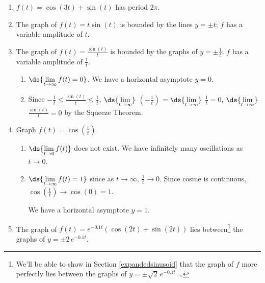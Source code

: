 \documentclass{ximera}
\begin{document}
\begin{enumerate}

\setcounter{enumi}{\value{HW}}

\item  $f(t) = \cos(3t) + \sin(t)$ has period $2\pi$.

\item  The graph of  $f(t) = t \sin(t)$ is bounded by the lines  $y = \pm t$;   $f$ has a variable amplitude of $t$.

\item The graph of $f(t) = \frac{\sin(t)}{t}$ is  bounded by the graphs of  $y = \pm \frac{1}{t}$; $f$ has a variable amplitude of $\frac{1}{t}$.

\begin{enumerate}

\item  $\ds{\lim_{t \rightarrow \infty} f(t) = 0}$.    We have a horizontal asymptote $y = 0$.

\item  Since   $-\frac{1}{t} \leq \frac{\sin(t)}{t} \leq \frac{1}{t}$,  $\ds{\lim_{t \rightarrow \infty}}$  $\left(- \frac{1}{t}\right)$ $=\ds{\lim_{t \rightarrow \infty}}$ $\frac{1}{t} = 0$,    $\ds{\lim_{t \rightarrow \infty}}$ $\frac{\sin(t)}{t} = 0$ by the Squeeze Theorem.

\end{enumerate}


\item  Graph $f(t) = \cos\left(\frac{1}{t}\right)$.  

\begin{enumerate}

\item   $\ds{\lim_{t \rightarrow 0} f(t)}$ does not exist.  We have infinitely many oscillations as $t \rightarrow 0$.

\item $\ds{\lim_{t \rightarrow \infty} f(t) = 1}$ since as $t \rightarrow \infty$, $\frac{1}{t} \rightarrow 0$.  Since cosine is continuous, $\cos\left(\frac{1}{t}\right) \rightarrow \cos(0) =  1$.  

\smallskip

We have a horizontal asymptote $y = 1$.

\end{enumerate}

\smallskip

\item  The graph of  $f(t) = e^{-0.1t} \left( \cos(2t) + \sin(2t)\right)$ lies between\footnote{We'll be able to show in Section \ref{expandedsinusoid} that the graph of $f$ more perfectly lies between the graphs of $y = \pm \sqrt{2} \, e^{-0.1 t}$ \ldots}  the graphs of $y = \pm 2 \, e^{-0.1t}$.
\begin{enumerate}


\end{enumerate}
\end{enumerate}
\end{document}
